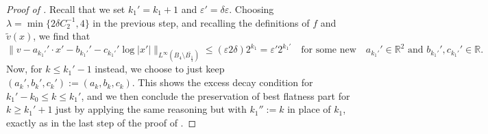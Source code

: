 \documentclass[10pt,a4paper]{amsart}
\newcommand{\R}{\mathbb{R}}
\newcommand{\ep}{\varepsilon}
\begin{document}
\begin{proof}[Proof of ]
Recall that we set $k_1'=k_1+1$ and $\ep'=\delta \ep$. Choosing $\lambda=\min\{2\delta C_2^{-1},4\}$ in the previous step, and recalling the definitions of $f$ and $\widetilde v(x)$, we find that
\begin{equation*}
    \|v- a_{k_1'}'\cdot x'- b_{k_1'}' - c_{k_1'}'\log|x'|\|_{L^\infty(B_{4}\setminus \overline{B_{\frac{1}{4}}})
}\leq (\ep 2\delta)2^{k_1}=\ep'2^{k_1'} \quad\mbox{for some new}\quad a_{k_1'}'\in\R^{2}\mbox{ and }b_{k_1'}', c_{k_1'}'\in\R.
\end{equation*}
Now, for $k\leq k_1'-1$ instead, we choose to just keep $(a_k',b_k',c_k'):=(a_k,b_k,c_k)$. This shows the excess decay condition for $k_1'-k_0\leq k \leq k_1'$, and we then conclude the preservation of best flatness part for $k\geq k_1'+1$ just by applying the same reasoning but with $k_1'':=k$ in place of $k_1$, exactly as in the last step of the proof of .
\end{proof}
\end{document}
